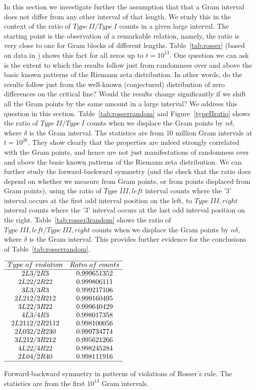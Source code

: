 \documentclass[twoside]{article}
\begin{document}
In this section we investigate further the assumption that that a Gram interval does not differ from any other interval of that length. We study this in the context of the ratio of $Type~II/Type~I$ counts in a given large interval. The starting point is the observation of a remarkable relation, namely, the ratio is very close to one for Gram blocks of different lengths.   Table~\ref{tab:rosser}  (based on data in \cite{gourdon}) shows this fact for all zeros up to $t = 10^{13}$. One question we can ask is the extent to which the results follow just from randomness over and above the basic known patterns of the Riemann zeta distribution. In other words, do the results follow just from the well-known (conjectured) distribution of zero differences on the critical line? Would the results change significantly if we shift all the Gram points  by the same amount in a large interval? We address this question in this section. Table~\ref{tab:rosserrandom} and Figure~\ref{typeIIratio} shows the ratio of $Type~II/Type~I$ counts when we displace the Gram points by $n\delta$, where $\delta$ is the Gram interval. The statistics are from $10$ million Gram intervals at $t=10^{28}$.
They  show clearly that the properties are indeed strongly correlated with the Gram points, and hence are not just manifestations of randomness over and above the basic known patterns of the Riemann zeta distribution. 
We can further study the forward-backward symmetry (and the check that the ratio does depend on whether we measure from Gram points, or from points displaced from Gram points), using the ratio of  $Type~III,left$ interval counts where the '3' interval occurs at the first odd interval position on the left, to  $Type~III,right$ interval counts where the '3' interval occurs at the last odd interval position on the right. 
Table~\ref{tab:rosser3random} shows the ratio of $Type~III,left/Type~III,right$ counts when we displace the Gram points by $n\delta$, where $\delta$ is the Gram interval. This provides further evidence for the conclusions of Table~\ref{tab:rosserrandom}.
  
\begin{table}
\centering \(\begin{array}{cc}
\hline
Type~of~violation &Ratio~of~counts\\
\hline
2L3/2R3 &0.999651352\\
2L22/2R22 &0.999806111\\
3L3/3R3 &0.999217106\\
2L212/2R212 &0.999160495\\
3L22/3R22 &0.999640429\\
4L3/4R3 &0.998017358\\
2L2112/2R2112 &0.998100056\\
2L032/2R230 &0.999734774\\
3L212/3R212 &0.995621266\\
4L22/4R22 &0.998245284\\
2L04/2R40 &0.998111916\\
\hline
\end{array}\)
\caption{Forward-backward symmetry in patterns of violations of Rosser's rule.  The statistics are from the first $10^{13}$ Gram intervals.} \label{tab:vrr}
\end{table}
\end{document}

